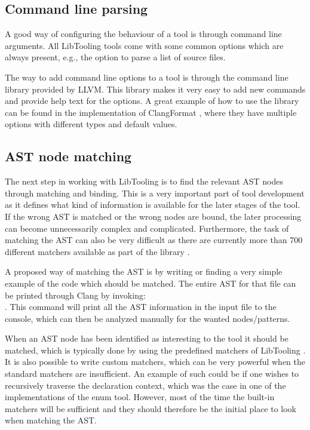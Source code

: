 \subsection{Command line parsing} \label{subsec:080dev:CMDLineParsing}

A good way of configuring the behaviour of a tool is through command line arguments. All LibTooling tools come with some common options which are always present, e.g., the option to parse a list of source files.

The way to add command line options to a tool is through the command line library provided by LLVM. This library makes it very easy to add new commands and provide help text for the options. A great example of how to use the library can be found in the implementation of ClangFormat \cite{clangClangFormatClangFormat2023}, where they have multiple options with different types and default values.

\pagebreak
\subsection{AST node matching} \label{subsec:080dev:ASTNodeMatching}

The next step in working with LibTooling is to find the relevant AST nodes through matching and binding. This is a very important part of tool development as it defines what kind of information is available for the later stages of the tool. If the wrong AST is matched or the wrong nodes are bound, the later processing can become unnecessarily complex and complicated. Furthermore, the task of matching the AST can also be very difficult as there are currently more than 700 different matchers available as part of the library \cite{clangASTMatcherReference}. 

A proposed way of matching the AST is by writing or finding a very simple example of the code which should be matched. The entire AST for that file can be printed through Clang by invoking:\\ . 
This command will print all the AST information in the input file to the console, which can then be analyzed manually for the wanted nodes/patterns.

When an AST node has been identified as interesting to the tool it should be matched, which is typically done by using the predefined matchers of LibTooling \cite{clangASTMatcherReference}.
It is also possible to write custom matchers, which can be very powerful when the standard matchers are insufficient. An example of such could be if one wishes to recursively traverse the declaration context, which was the case in one of the implementations of the enum tool.
However, most of the time the built-in matchers will be sufficient and they should therefore be the initial place to look when matching the AST.

